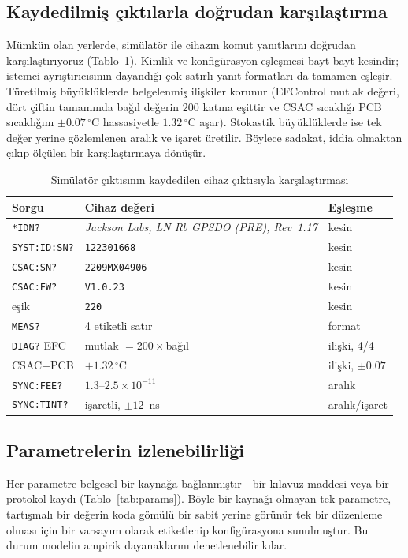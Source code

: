 \documentclass[9pt,twocolumn,a4paper]{extarticle}
\begin{document}
\subsection{Kaydedilmiş çıktılarla doğrudan karşılaştırma}
Mümkün olan yerlerde, simülatör ile cihazın komut yanıtlarını doğrudan karşılaştırıyoruz (Tablo~\ref{tab:fidelity}). Kimlik ve konfigürasyon eşleşmesi bayt bayt kesindir; istemci ayrıştırıcısının dayandığı çok satırlı yanıt formatları da tamamen eşleşir. Türetilmiş büyüklüklerde belgelenmiş ilişkiler korunur (EFControl mutlak değeri, dört çiftin tamamında bağıl değerin $200$ katına eşittir ve CSAC sıcaklığı PCB sıcaklığını $\pm0.07\,^\circ$C hassasiyetle $1.32\,^\circ$C aşar). Stokastik büyüklüklerde ise tek değer yerine gözlemlenen aralık ve işaret üretilir. Böylece sadakat, iddia olmaktan çıkıp ölçülen bir karşılaştırmaya dönüşür.

\begin{table}[t]
\caption{Simülatör çıktısının kaydedilen cihaz çıktısıyla karşılaştırması}
\label{tab:fidelity}
\centering
\footnotesize
\renewcommand{\arraystretch}{1.2}
\begin{tabular}{@{}p{}p{}p{}@{}}
\toprule
\textbf{Sorgu} & \textbf{Cihaz değeri} & \textbf{Eşleşme} \\
\midrule
\texttt{*IDN?} & \emph{Jackson Labs, LN Rb GPSDO (PRE), Rev~1.17} & kesin \\
\texttt{SYST:ID:SN?} & \texttt{122301668} & kesin \\
\texttt{CSAC:SN?} & \texttt{2209MX04906} & kesin \\
\texttt{CSAC:FW?} & \texttt{V1.0.23} & kesin \\
eşik & \texttt{220} & kesin \\
\texttt{MEAS?} & 4 etiketli satır & format \\
\texttt{DIAG?} EFC & mutlak $=200\times$bağıl & ilişki, 4/4 \\
CSAC$-$PCB & $+1.32\,^\circ$C & ilişki, $\pm0.07$ \\
\texttt{SYNC:FEE?} & $1.3$--$2.5\times10^{-11}$ & aralık \\
\texttt{SYNC:TINT?} & işaretli, $\pm12$~ns & aralık/işaret \\
\bottomrule
\end{tabular}
\end{table}

\subsection{Parametrelerin izlenebilirliği}
Her parametre belgesel bir kaynağa bağlanmıştır---bir kılavuz maddesi veya bir protokol kaydı (Tablo~\ref{tab:params}). Böyle bir kaynağı olmayan tek parametre, tartışmalı bir değerin koda gömülü bir sabit yerine görünür tek bir düzenleme olması için bir varsayım olarak etiketlenip konfigürasyona sunulmuştur. Bu durum modelin ampirik dayanaklarını denetlenebilir kılar.
\end{document}
